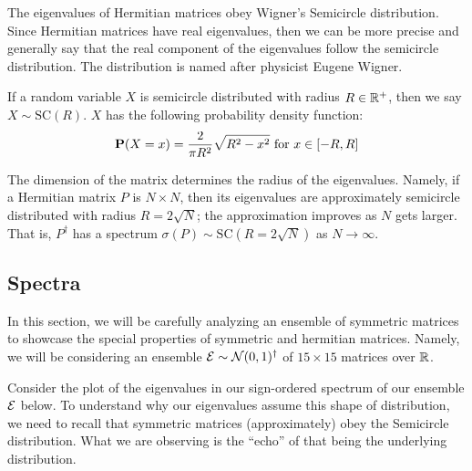 The eigenvalues of Hermitian matrices obey Wigner's Semicircle distribution.
Since Hermitian matrices have real eigenvalues, then we can be more precise and generally say that the real component of the eigenvalues follow the semicircle distribution.
The distribution is named after physicist Eugene Wigner.

\begin{definition}
If a random variable $X$ is semicircle distributed with radius $R \in \mathbb{R}^+$, then we say $X \sim \text{SC}(R)$. $X$ has the following probability density function:
$$\textbf{P}(X = x) = \frac{2}{\pi R^2} \sqrt{R^2 - x^2} \text{ for } x \in [-R, R]$$
\end{definition}

\begin{remark}
The dimension of the matrix determines the radius of the eigenvalues.
Namely, if a Hermitian matrix $P$ is $N \times N$, then its eigenvalues are approximately semicircle distributed with radius $R = 2\sqrt{N}$; the approximation improves as $N$ gets larger.
That is, $P^{\dagger}$ has a spectrum $\sigma({P}) \sim \text{SC}(R = 2\sqrt{N})$ as $N \to \infty$.
\end{remark}


\newpage
\subsection{Spectra}

In this section, we will be carefully analyzing an ensemble of symmetric matrices to showcase
the special properties of symmetric and hermitian matrices.
Namely, we will be considering an ensemble $\mathcal{E} \sim \mathcal{N}(0,1)^\dagger$ of $15 \times 15$ matrices over $\mathbb{R}$.


Consider the plot of the eigenvalues in our sign-ordered spectrum of our ensemble $\mathcal{E}$ below. To understand why our eigenvalues assume this shape of distribution, we need to recall that symmetric matrices (approximately) obey the Semicircle distribution. What we are observing is the ``echo'' of that being the underlying distribution.

